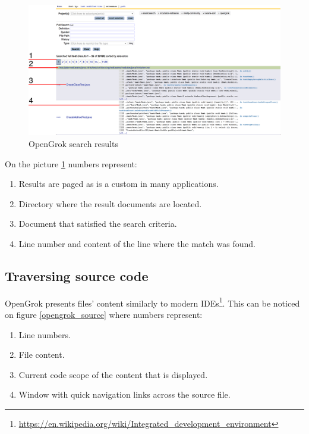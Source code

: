 \begin{figure}[htbp]
    \centering
    \includegraphics[width=145mm]{../img/opengrok_results.png}
    \caption{OpenGrok search results}
    \label{opengrok_results}
\end{figure}

On the picture \ref{opengrok_results} numbers represent:
\begin{enumerate}
    \item Results are paged as is a custom in many applications.
    \item Directory where the result documents are located.
    \item Document that satisfied the search criteria.
    \item Line number and content of the line where the match was found.
\end{enumerate}

\subsection{Traversing source code}

OpenGrok presents files' content similarly to modern
IDEs\footnote{\url{https://en.wikipedia.org/wiki/Integrated_development_environment}}. This can be noticed on figure
\ref{opengrok_source} where numbers represent:

\begin{enumerate}
    \item Line numbers.
    \item File content.
    \item Current code scope of the content that is displayed.
    \item Window with quick navigation links across the source file.
\end{enumerate}

